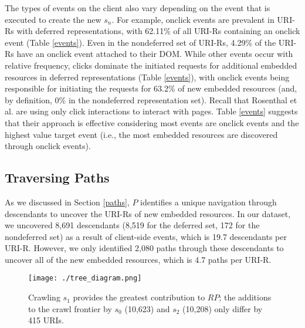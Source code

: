 \documentclass{sig-alternate}
\begin{document}
The types of events on the client also vary depending on the event that is executed to create the new $s_n$. For example, onclick events are prevalent in URI-Rs with deferred representations, with 62.11\% of all URI-Rs containing an onclick event (Table \ref{events}). Even in the nondeferred set of URI-Rs, 4.29\% of the URI-Rs have an onclick event attached to their DOM. While other events occur with relative frequency, clicks dominate the initiated requests for additional embedded resources in deferred representations (Table \ref{events}), with onclick events being responsible for initiating the requests for 63.2\% of new embedded resources (and, by definition, 0\% in the nondeferred representation set). Recall that Rosenthal et al. are using only click interactions to interact with pages. Table \ref{events} suggests that their approach is effective considering most events are onclick events and the highest value target event (i.e., the most embedded resources are discovered through onclick events). 


\subsection{Traversing Paths}
\label{traversingPaths}
As we discussed in Section \ref{paths}, $P$ identifies a unique navigation through descendants to uncover the URI-Rs of new embedded resources. In our dataset, we uncovered 8,691 descendants (8,519 for the deferred set, 172 for the nondeferred set) as a result of client-side events, which is 19.7 descendants per URI-R. However, we only identified 2,080 paths through these descendants to uncover all of the new embedded resources, which is 4.7 paths per URI-R. 


\begin{figure}
\centering
\texttt{[image: ./tree\_diagram.png]}
\caption{Crawling $s_1$ provides the greatest contribution to $RP$; the additions to the crawl frontier by $s_0$ (10,623) and $s_2$ (10,208) only differ by 415 URIs.}
\label{growth2a}
\end{figure}
\end{document}
